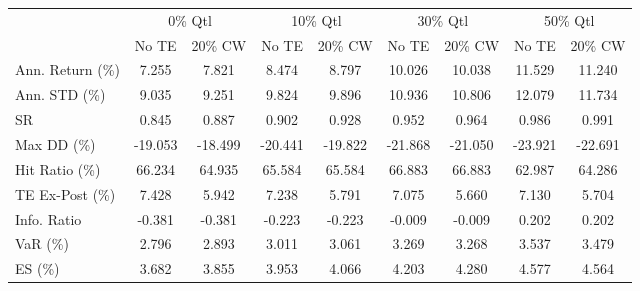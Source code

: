 \begin{tabular}{lcccccccc}
\toprule
{} & \multicolumn{2}{c}{0\% Qtl} & \multicolumn{2}{c}{10\% Qtl} & \multicolumn{2}{c}{30\% Qtl} & \multicolumn{2}{c}{50\% Qtl} \\
{} &   No TE &  20\% CW &   No TE &  20\% CW &   No TE &  20\% CW &   No TE &  20\% CW \\
\midrule
Ann. Return (\%) &   7.255 &   7.821 &   8.474 &   8.797 &  10.026 &  10.038 &  11.529 &  11.240 \\
Ann. STD (\%)    &   9.035 &   9.251 &   9.824 &   9.896 &  10.936 &  10.806 &  12.079 &  11.734 \\
SR              &   0.845 &   0.887 &   0.902 &   0.928 &   0.952 &   0.964 &   0.986 &   0.991 \\
Max DD (\%)      & -19.053 & -18.499 & -20.441 & -19.822 & -21.868 & -21.050 & -23.921 & -22.691 \\
Hit Ratio (\%)   &  66.234 &  64.935 &  65.584 &  65.584 &  66.883 &  66.883 &  62.987 &  64.286 \\
TE Ex-Post (\%)  &   7.428 &   5.942 &   7.238 &   5.791 &   7.075 &   5.660 &   7.130 &   5.704 \\
Info. Ratio     &  -0.381 &  -0.381 &  -0.223 &  -0.223 &  -0.009 &  -0.009 &   0.202 &   0.202 \\
VaR (\%)         &   2.796 &   2.893 &   3.011 &   3.061 &   3.269 &   3.268 &   3.537 &   3.479 \\
ES (\%)          &   3.682 &   3.855 &   3.953 &   4.066 &   4.203 &   4.280 &   4.577 &   4.564 \\
\bottomrule
\end{tabular}
